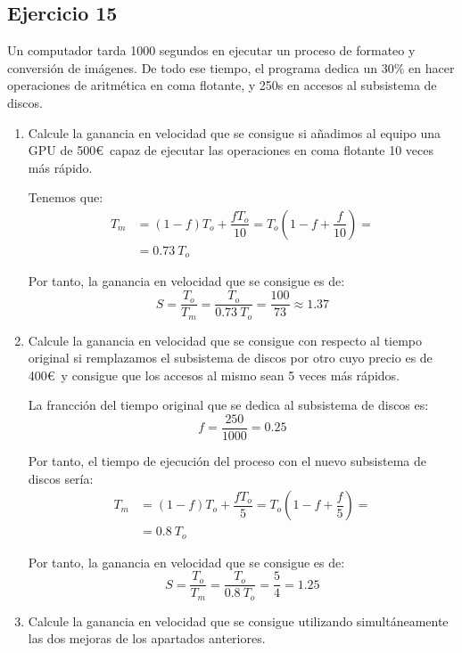 \subsection*{Ejercicio 15}

Un computador tarda 1000 segundos en ejecutar un proceso de formateo y conversión de imágenes. De todo ese tiempo, el programa dedica un 30\% en hacer operaciones de aritmética en coma flotante, y 250s en accesos al subsistema de discos.

\begin{enumerate}
    \item Calcule la ganancia en velocidad que se consigue si añadimos al equipo una GPU de 500\euro~capaz de ejecutar las operaciones en coma flotante 10 veces más rápido.
    
    Tenemos que:
    \begin{align*}
        T_m &= (1-f)T_o + \dfrac{fT_o}{10} = T_o\left(1-f+\dfrac{f}{10}\right)
        =\\&= 0.73\ T_o
    \end{align*}

    Por tanto, la ganancia en velocidad que se consigue es de:
    \begin{equation*}
        S = \dfrac{T_o}{T_m} = \dfrac{T_o}{0.73\ T_o} = \dfrac{100}{73} \approx 1.37
    \end{equation*}
    \item Calcule la ganancia en velocidad que se consigue con respecto al tiempo original si remplazamos el subsistema de discos por otro cuyo precio es de 400\euro~y consigue que los accesos al mismo sean 5 veces más rápidos.
    
    La francción del tiempo original que se dedica al subsistema de discos es:
    \begin{equation*}
        f = \dfrac{250}{1000} = 0.25
    \end{equation*}

    Por tanto, el tiempo de ejecución del proceso con el nuevo subsistema de discos sería:
    \begin{align*}
        T_m &= (1-f)T_o + \dfrac{fT_o}{5} = T_o\left(1-f+\dfrac{f}{5}\right)
        =\\&= 0.8\ T_o
    \end{align*}

    Por tanto, la ganancia en velocidad que se consigue es de:
    \begin{equation*}
        S = \dfrac{T_o}{T_m} = \dfrac{T_o}{0.8\ T_o} = \dfrac{5}{4} = 1.25
    \end{equation*}
    \item Calcule la ganancia en velocidad que se consigue utilizando simultáneamente las dos mejoras de los apartados anteriores.
    

\end{enumerate}
